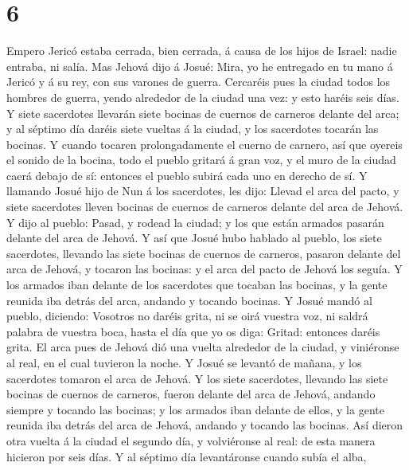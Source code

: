 \hypertarget{section-5}{%
\section{6}\label{section-5}}

 Empero Jericó estaba cerrada, bien cerrada, á causa de los
hijos de Israel: nadie entraba, ni salía.  Mas Jehová dijo á
Josué: Mira, yo he entregado en tu mano á Jericó y á su rey, con sus
varones de guerra.  Cercaréis pues la ciudad todos los
hombres de guerra, yendo alrededor de la ciudad una vez: y esto haréis
seis días.  Y siete sacerdotes llevarán siete bocinas de
cuernos de carneros delante del arca; y al séptimo día daréis siete
vueltas á la ciudad, y los sacerdotes tocarán las bocinas. 
Y cuando tocaren prolongadamente el cuerno de carnero, así que oyereis
el sonido de la bocina, todo el pueblo gritará á gran voz, y el muro de
la ciudad caerá debajo de sí: entonces el pueblo subirá cada uno en
derecho de sí.  Y llamando Josué hijo de Nun á los
sacerdotes, les dijo: Llevad el arca del pacto, y siete sacerdotes
lleven bocinas de cuernos de carneros delante del arca de Jehová.
 Y dijo al pueblo: Pasad, y rodead la ciudad; y los que
están armados pasarán delante del arca de Jehová.  Y así que
Josué hubo hablado al pueblo, los siete sacerdotes, llevando las siete
bocinas de cuernos de carneros, pasaron delante del arca de Jehová, y
tocaron las bocinas: y el arca del pacto de Jehová los seguía.
 Y los armados iban delante de los sacerdotes que tocaban
las bocinas, y la gente reunida iba detrás del arca, andando y tocando
bocinas.  Y Josué mandó al pueblo, diciendo: Vosotros no
daréis grita, ni se oirá vuestra voz, ni saldrá palabra de vuestra boca,
hasta el día que yo os diga: Gritad: entonces daréis grita.
 El arca pues de Jehová dió una vuelta alrededor de la
ciudad, y viniéronse al real, en el cual tuvieron la noche.
 Y Josué se levantó de mañana, y los sacerdotes tomaron el
arca de Jehová.  Y los siete sacerdotes, llevando las siete
bocinas de cuernos de carneros, fueron delante del arca de Jehová,
andando siempre y tocando las bocinas; y los armados iban delante de
ellos, y la gente reunida iba detrás del arca de Jehová, andando y
tocando las bocinas.  Así dieron otra vuelta á la ciudad el
segundo día, y volviéronse al real: de esta manera hicieron por seis
días.  Y al séptimo día levantáronse cuando subía el alba,
